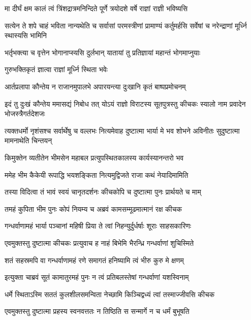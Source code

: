 \twolineshloka
{मा दीर्घं क्षम कालं त्वं त्रिंशद्रात्रमनिन्दिते}
{पूर्णे त्रयोदशे वर्षे राज्ञां राज्ञी भविष्यसि}


\onelineshloka
{सत्येन ते शपे चाहं भविता नान्यथेति च}
\twolineshloka
{सर्वासां परमस्त्रीणां प्रामाण्यं कर्तुमर्हसि}
{सर्वेषां च नरेन्द्राणां मूर्ध्नि स्थास्यसि भामिनि}


\twolineshloka
{भर्तृभक्त्या च वृत्तेन भोगानाप्स्यसि दुर्लभान्}
{यातायां तु प्रतिज्ञायां महान्तं भोगमाप्नुयाः}


\onelineshloka
{गुरुभक्तिकृतं ज्ञात्वा राज्ञां मूर्ध्नि स्थिता भवेः}



\twolineshloka
{आर्तप्रलापा कौन्तेय न राजानमुपालभे}
{अपारयन्त्या दुःखानि कृतं बाष्पप्रमोचनम्}


\onelineshloka
{इदं तु दुःखं कौन्तेय ममासद्यं निबोध तत्}
\twolineshloka
{योऽयं राज्ञो विराटस्य सूतपुत्रस्तु कीचकः}
{स्यालो नाम प्रवादेन भोजस्त्रैगर्तदेशजः}


\threelineshloka
{त्यक्तधर्मो नृशंसश्च सर्वार्थेषु च वल्लभः}
{नित्यमेवाह दुष्टात्मा भार्या मे भव शोभने}
{अविनीतः सुदुष्टात्मा मामनाथेति चिन्तयन्}


\twolineshloka
{किमुक्तेन व्यतीतेन भीमसेन महाबल}
{प्रत्युपस्थितकालस्य कार्यस्यानन्तरो भव}


\twolineshloka
{ममेह भीम कैकेयी रूपाद्धि भयशङ्किता}
{नित्यमुद्विजते राजा कथं नेयादिमामिति}


\twolineshloka
{तस्या विदित्वा तं भावं स्वयं चानृतदर्शनः}
{कीचकोपि च दुष्टात्मा पुनः प्रार्थयते च माम्}


\twolineshloka
{तमहं कुपिता भीम पुनः कोपं नियम्य च}
{अब्रवं कामसम्मूढमात्मानं रक्ष कीचक}


\twolineshloka
{गन्धर्वाणामहं भार्या पञ्चानां महिषी प्रिया}
{ते त्वां निहन्युर्दुर्धर्षाः शूराः साहसकारिणः}


\twolineshloka
{एवमुक्तस्तु दुष्टात्मा कीचकः प्रत्युवाच ह}
{नाहं बिभेमि भैरन्ध्रि गन्धर्वाणां शुचिस्मिते}


\twolineshloka
{शतं सहस्रमपि वा गन्धर्वाणामहं रणे}
{समागतं हनिष्यामि त्वं भीरु कुरु मे क्षणम्}


\twolineshloka
{इत्युक्ता चाब्रवं सूतं कामातुरमहं पुनः}
{न त्वं प्रतिबलस्तेषां गन्धर्वाणां यशस्विनाम्}


\twolineshloka
{धर्मे स्थिताऽस्मि सततं कुलशीलसमन्विता}
{नेच्छामि किञ्चिद्वध्यं त्वां तस्माज्जीवसि कीचक}


\twolineshloka
{एवमुक्तस्तु दुष्टात्मा प्रहस्य स्वनवत्ततः}
{न तिष्ठिति स सन्मार्गे न च धर्मं बुभूषति}


